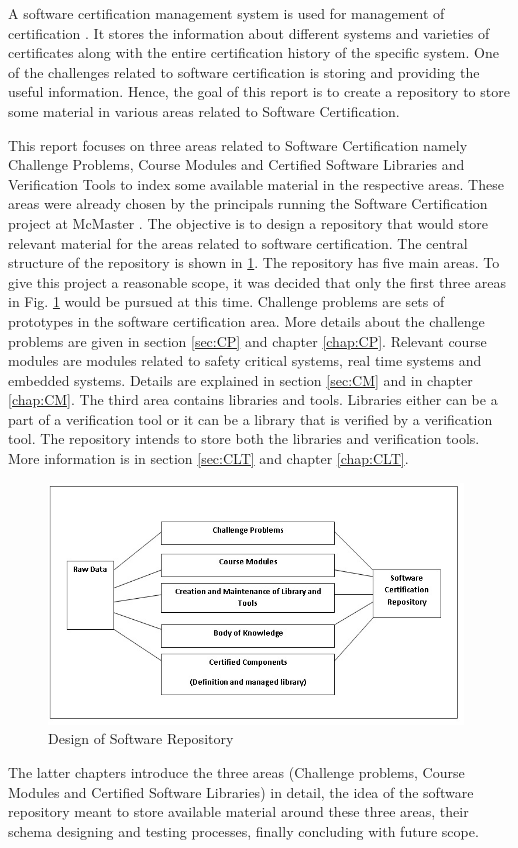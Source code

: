 \documentclass[11pt,letterpaper]{report}
\begin{document}
A software certification management system is used for management of certification \cite{SCMS}. It stores the information about different systems and varieties of certificates along with the entire certification history of the specific system. One of the challenges related to software certification is storing and providing the useful information. Hence, the goal of this report is to create a repository to store some material in various areas related to Software Certification.

This report focuses on three areas related to Software Certification namely Challenge Problems, Course Modules and Certified Software Libraries and Verification Tools to index some available material in the respective areas. These areas were already chosen by the principals running the Software Certification project at McMaster \cite{McCert}. The objective is to design a repository that would store relevant material for the areas related to software certification. The central structure of the repository is shown in \ref{Fig:1}. The repository has five main areas. To give this project a reasonable scope, it was decided that only the first three areas in Fig. \ref{Fig:1} would be pursued at this time. Challenge problems are sets of prototypes in the software certification area. More details about the challenge problems are given in section \ref{sec:CP} and chapter \ref{chap:CP}. Relevant course modules are modules related to safety critical systems, real time systems and embedded systems. Details are explained in section \ref{sec:CM} and in chapter \ref{chap:CM}. The third area contains libraries and tools. Libraries either can be a part of a verification tool or it can be a library that is verified by a verification tool. The repository intends to store both the libraries and verification tools. More information is in section \ref{sec:CLT} and chapter \ref{chap:CLT}.

\begin{figure}[ht]
\centering
\includegraphics[width=110mm]{Images/Overview_SW_Repo.jpg}
\caption{Design of Software Repository}
\label{Fig:1}
\end{figure}
The latter chapters introduce the three areas (Challenge problems, Course Modules and Certified Software Libraries)  in detail, the idea of the software repository meant to store available material around these three areas, their schema designing and testing processes, finally concluding with future scope.
\end{document}
